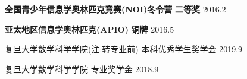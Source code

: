 



\begin{cvhonors}


  \cvhonor
    {\textbf{全国青少年信息学奥林匹克竞赛(NOI)冬令营}} %
    {\textbf{二等奖}} %
    {} %
    {2016.2} %

  \cvhonor
    {\textbf{亚太地区信息学奥林匹克(APIO)}} %
    {\textbf{铜牌}} %
    {} %
    {2016.5} %

  \cvhonor
    {复旦大学数学科学学院(注:转专业前)} %
    {本科优秀学生奖学金} %
    {} %
    {2019.9} %

  \cvhonor
    {复旦大学数学科学学院} %
    {专业奖学金} %
    {} %
    {2018.9} %

\end{cvhonors}

